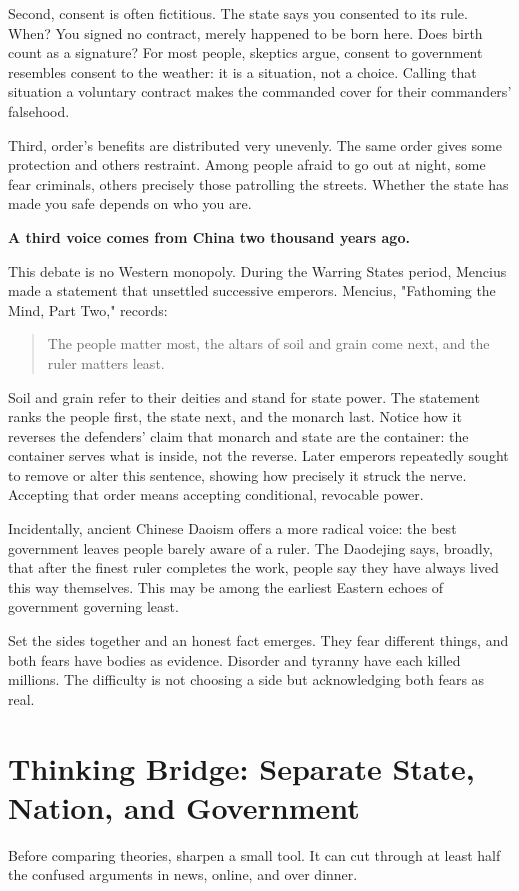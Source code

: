 Second, consent is often fictitious. The state says you consented to its rule. When? You signed no contract, merely happened to be born here. Does birth count as a signature? For most people, skeptics argue, consent to government resembles consent to the weather: it is a situation, not a choice. Calling that situation a voluntary contract makes the commanded cover for their commanders' falsehood.

Third, order's benefits are distributed very unevenly. The same order gives some protection and others restraint. Among people afraid to go out at night, some fear criminals, others precisely those patrolling the streets. Whether the state has made you safe depends on who you are.

\textbf{A third voice comes from China two thousand years ago.}

This debate is no Western monopoly. During the Warring States period, Mencius made a statement that unsettled successive emperors. Mencius, "Fathoming the Mind, Part Two," records:

\begin{quote}
The people matter most, the altars of soil and grain come next, and the ruler matters least.
\end{quote}
Soil and grain refer to their deities and stand for state power. The statement ranks the people first, the state next, and the monarch last. Notice how it reverses the defenders' claim that monarch and state are the container: the container serves what is inside, not the reverse. Later emperors repeatedly sought to remove or alter this sentence, showing how precisely it struck the nerve. Accepting that order means accepting conditional, revocable power.

Incidentally, ancient Chinese Daoism offers a more radical voice: the best government leaves people barely aware of a ruler. The Daodejing says, broadly, that after the finest ruler completes the work, people say they have always lived this way themselves. This may be among the earliest Eastern echoes of government governing least.

Set the sides together and an honest fact emerges. They fear different things, and both fears have bodies as evidence. Disorder and tyranny have each killed millions. The difficulty is not choosing a side but acknowledging both fears as real.

\section[State, Nation, and Government]{Thinking Bridge: Separate State, Nation, and Government}
Before comparing theories, sharpen a small tool. It can cut through at least half the confused arguments in news, online, and over dinner.

